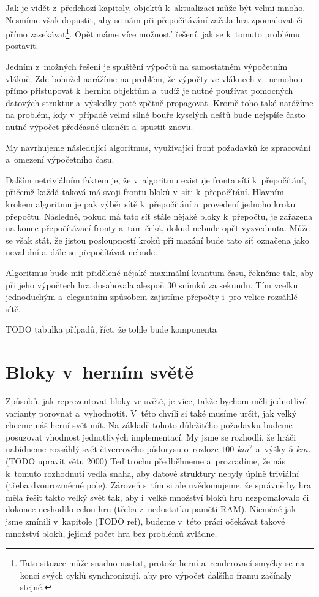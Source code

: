 Jak je vidět z~předchozí kapitoly, objektů k~aktualizaci může být velmi mnoho. Nesmíme však dopustit, aby se nám při přepočítávání začala hra zpomalovat či přímo zasekávat\footnote{Tato situace může snadno nastat, protože herní a~renderovací smyčky se na konci svých cyklů synchronizují, aby pro výpočet dalšího framu začínaly stejně.}. Opět máme více možností řešení, jak se k~tomuto problému postavit. 

Jedním z~možných řešení je spuštění výpočtů na samostatném výpočetním vlákně. Zde bohužel narážíme na problém, že výpočty ve vláknech v~\UEu{} nemohou přímo přistupovat k~herním objektům a~tudíž je nutné používat pomocných datových struktur a~výsledky poté zpětně propagovat. Kromě toho také narážíme na problém, kdy v~případě velmi silné bouře kyselých dešťů bude nejspíše často nutné výpočet předčasně ukončit a~spustit znovu.

My navrhujeme následující algoritmus, využívající front požadavků ke zpracování a~omezení výpočetního času. 

 Dalším netriviálním faktem je, že v~algoritmu existuje fronta sítí k~přepočítání, přičemž každá taková má svoji frontu bloků v~síti k~přepočítání. Hlavním krokem algoritmu je pak výběr sítě k~přepočítání a~provedení jednoho kroku přepočtu. Následně, pokud má tato síť stále nějaké bloky k~přepočtu, je zařazena na konec přepočítávací fronty a~tam čeká, dokud nebude opět vyzvednuta. Může se však stát, že jistou posloupností kroků při mazání bude tato síť označena jako nevalidní a~dále se přepočítávat nebude.

Algoritmus bude mít přidělené nějaké maximální kvantum času, řekněme tak, aby při jeho výpočtech hra dosahovala alespoň 30 snímků za sekundu. Tím vcelku jednoduchým a~elegantním způsobem zajistíme přepočty i~pro velice rozsáhlé sítě. 

TODO tabulka případů, říct, že tohle bude komponenta



\section{Bloky v~herním světě}
\label{sec:blocksWorld}

Způsobů, jak reprezentovat bloky ve světě, je více, takže bychom měli jednotlivé varianty porovnat a~vyhodnotit. V~této chvíli si také musíme určit, jak velký chceme náš herní svět mít. Na základě tohoto důležitého požadavku budeme posuzovat vhodnost jednotlivých implementací. My jsme se rozhodli, že hráči nabídneme rozsáhlý svět čtvercového půdorysu o~rozloze $100\,\ km^2$ a~výšky $5\,\ km$. (TODO upravit větu 2000) Teď trochu předběhneme a~prozradíme, že nás k~tomuto rozhodnutí vedla snaha, aby datové struktury nebyly úplně triviální (třeba dvourozměrné pole). Zároveň s~tím si ale uvědomujeme, že správně by hra měla řešit takto velký svět tak, aby i~velké množství bloků hru nezpomalovalo či dokonce neshodilo celou hru (třeba z~nedostatku paměti RAM). Nicméně jak jsme zmínili v~kapitole (TODO ref), budeme v~této práci očekávat takové množství bloků, jejichž počet hra bez problémů zvládne.

